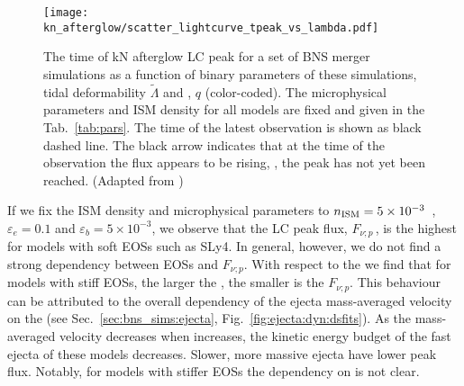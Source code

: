 \begin{figure}[t]
    \centering 
    \texttt{[image: kn\_afterglow/scatter\_lightcurve\_tpeak\_vs\_lambda.pdf]}
    \caption{
        The time of \ac{kN} afterglow \ac{LC} peak for a set of \ac{BNS} merger simulations 
        as a function of binary parameters of these simulations, 
        tidal deformability $\tilde{\Lambda}$ and \mr{}, $q$ (color-coded). 
        The microphysical parameters and \ac{ISM} density for all models are fixed and 
        given in the Tab.~\ref{tab:pars}.
        The time of the latest \GRB{} observation is shown as black dashed line.
        The black arrow indicates that at the time of the observation the flux appears 
        to be rising, \ie, the peak has not yet been reached.
        (Adapted from \citet{Nedora:2021eoj})
    } 
    \label{fig:lightcurve_peaks}
\end{figure}

If we fix the \ac{ISM} density and microphysical parameters to 
$n_{\text{ISM}}=5\times10^{-3}$~\gcm, $\varepsilon_e=0.1$ and $\varepsilon_b=5\times10^{-3}$, 
we observe that the \ac{LC} peak flux, $F_{\nu;p}\,$, is the highest 
for models with soft \acp{EOS} such as SLy4. 
In general, however, we do not find a strong dependency between \acp{EOS} and $F_{\nu;p}$.
With respect to the \mr{} we find that for models with stiff \acp{EOS}, 
the larger the \mr{}, the smaller is the $F_{\nu;p}$. 
%
This behaviour can be attributed to the overall dependency of the ejecta mass-averaged 
velocity on the \mr{} (see Sec.~\ref{sec:bns_sims:ejecta}, Fig.~\ref{fig:ejecta:dyn:dsfits}).
As the mass-averaged velocity decreases when \mr{} increases, the 
kinetic energy budget of the fast ejecta of these models decreases. 
Slower, more massive ejecta have lower peak flux.
Notably, for models with stiffer \acp{EOS} the dependency on \mr{} is not clear. 

